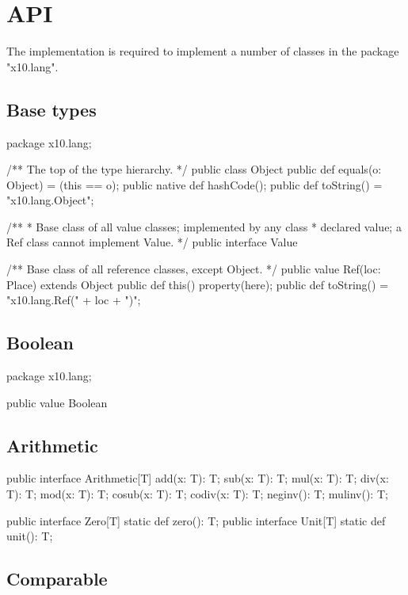 \chapter{API}\label{XtenAPI}

The \Xten{} implementation is required to implement a number of
classes in the package \xcd"x10.lang".

\section{Base types}

\begin{xten}
package x10.lang;

/** The top of the type hierarchy. */
public class Object {
    public def equals(o: Object) = (this == o);
    public native def hashCode();
    public def toString() = "x10.lang.Object";
}

/**
 * Base class of all value classes; implemented by any class
 * declared value; a Ref class cannot implement Value.
 */
public interface Value { }

/** Base class of all reference classes, except Object. */
public value Ref(loc: Place) extends Object {
    public def this() { property(here); }
    public def toString() = "x10.lang.Ref(" + loc + ")";
}
\end{xten}

\section{Boolean}

\begin{xten}
package x10.lang;

public value Boolean { }
\end{xten}

\section{Arithmetic}

\begin{xten}
public interface Arithmetic[T] {
    add(x: T): T;
    sub(x: T): T;
    mul(x: T): T;
    div(x: T): T;
    mod(x: T): T;
    cosub(x: T): T;
    codiv(x: T): T;
    neginv(): T;
    mulinv(): T;
}

public interface Zero[T] { static def zero(): T; }
public interface Unit[T] { static def unit(): T; }
\end{xten}


\section{Comparable}

